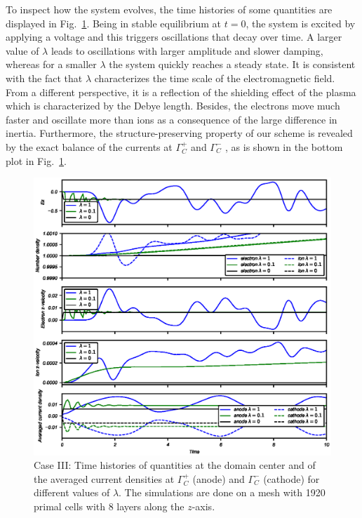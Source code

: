 \documentclass{article}
\begin{document}
To inspect how the system evolves, the time histories of some quantities are displayed in
Fig.~\ref{fig:origin-data_vs_time}. Being in stable equilibrium at $t=0$, the system is
excited by applying a voltage and this triggers oscillations that decay over time. A
larger value of $\lambda$ leads to oscillations with larger amplitude and slower damping,
whereas for a smaller $\lambda$ the system quickly reaches a steady state. It is
consistent with the fact that $\lambda$ characterizes the time scale of the
electromagnetic field. From a different perspective, it is a reflection of the shielding
effect of the plasma which is characterized by the Debye length. Besides, the electrons
move much faster and oscillate more than ions as a consequence of the large difference in
inertia. Furthermore, the structure-preserving property of our scheme is revealed by the
exact balance of the currents at $\Gamma^+_C$ and $\Gamma^-_C$ \cite{Hiptmair_2021}, as is
shown in the bottom plot in Fig.~\ref{fig:origin-data_vs_time}.

\begin{figure}
  \centering
    \includegraphics[scale=0.9]{data-vs-time_stepVoltage.eps}
    \caption{Case III: Time histories of quantities at the domain center and of the averaged current densities at $\Gamma^+_C$ (anode) and $\Gamma^-_C$ (cathode) for different values of $\lambda$. The simulations are done on a mesh with 1920 primal cells with 8 layers along the $z$-axis.}
    \label{fig:origin-data_vs_time}
\end{figure}
\end{document}
